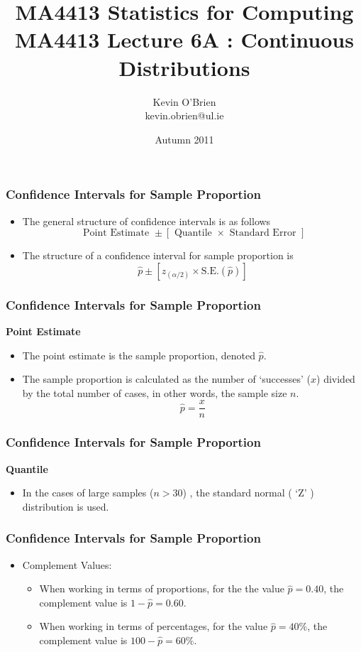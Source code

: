 \documentclass[a4]{beamer}
\title[MA4704]{MA4413 Statistics for Computing \\ {\normalsize MA4413 Lecture 6A : Continuous Distributions}}
\author[Kevin O'Brien]{Kevin O'Brien \\ {\scriptsize kevin.obrien@ul.ie}}
\date{Autumn 2011}
\institute[Maths \& Stats]{Dept. of Mathematics \& Statistics, \\ University \textit{of} Limerick}
\begin{document}

\begin{frame}
\frametitle{Confidence Intervals for Sample Proportion}
\Large
\begin{itemize}
\item The general structure of confidence intervals is as follows
\[ \mbox{ Point Estimate } \pm \left[ \mbox{ Quantile } \times \mbox{ Standard Error } \right] \]
\item The structure of a confidence interval for sample proportion is
\[ \hat{p} \pm \left[ z_{(\alpha/2)} \times \mbox{S.E.}(\hat{p}) \right]\]


\end{itemize}
\end{frame}

\begin{frame}
\frametitle{Confidence Intervals for Sample Proportion}
\Large
\textbf{Point Estimate}
\begin{itemize}
\item The point estimate is the sample proportion, denoted $\hat{p}$.  
\item The sample proportion is calculated as the number of `successes' ($x$) divided by the total number of cases, in other words, the sample size $n$.
\[  \hat{p} = \frac{x}{n}  \]
\end{itemize}
\end{frame}

\begin{frame}
\frametitle{Confidence Intervals for Sample Proportion}
\textbf{Quantile}
\begin{itemize}
\item In the cases of large samples ($ n > 30$) , the standard normal ( `Z' ) distribution is used.

\end{itemize}
\end{frame}


\begin{frame}
\frametitle{Confidence Intervals for Sample Proportion}

\begin{itemize}

\item Complement Values:
\begin{itemize} \item When working in terms of proportions, for the the value $\hat{p} =0.40$, the complement value is $1-\hat{p} =0.60$.
\item When working in terms of percentages, for the value $\hat{p} = 40\%$, the complement value is $100-\hat{p} = 60\%$.
\end{itemize}
\end{itemize}
\end{frame}
\end{document}
